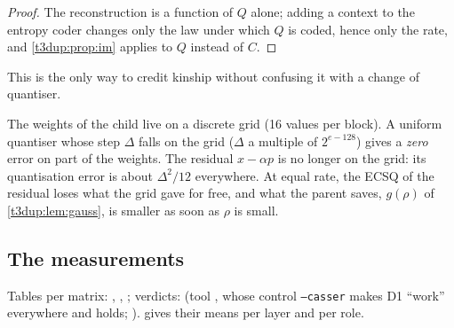 \begin{proof}
The reconstruction is a function of $Q$ alone; adding a context to the entropy coder changes only the law under which $Q$ is coded, hence only the rate, and \cref{t3dup:prop:im} applies to $Q$ instead of $C$.
\end{proof}

This is the only way to credit kinship without confusing it with a change of quantiser.

\begin{remarque}\label{t3dup:rem:grille}
The weights of the child live on a discrete grid (16 values per block). A uniform quantiser whose step $\Delta$ falls on the grid ($\Delta$ a multiple of $2^{e-128}$) gives a \emph{zero} error on part of the weights. The residual $x - \alpha p$ is no longer on the grid: its quantisation error is about $\Delta^2/12$ everywhere. At equal rate, the ECSQ of the residual loses what the grid gave for free, and what the parent saves, $g(\rho)$ of \cref{t3dup:lem:gauss}, is smaller as soon as $\rho$ is small.
\end{remarque}

\subsection{The measurements}

Tables per matrix: , , ; verdicts:  (tool , whose control \texttt{--casser} makes D1 ``work'' everywhere and holds; ).  gives their means per layer and per role.

